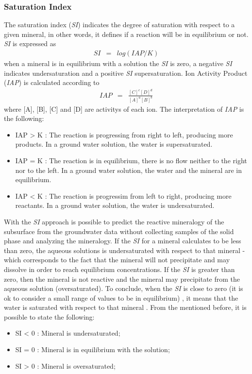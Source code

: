 \documentclass[ppgc,mestrado,english]{iiufrgs}
\begin{document}
\subsubsection{Saturation Index}
The saturation index (\emph{SI}) indicates the degree of saturation with respect to a given mineral, in other words, it defines if a reaction will be in equilibrium or not. \emph{SI} is expressed as
\begin{eqnarray} \label{eq:siEq}
SI &=& log (IAP / K )
\end{eqnarray}
when a mineral is in equilibrium with a solution the \emph{SI} is zero, a negative \emph{SI} indicates undersaturation and a positive \emph{SI} supersaturation. 
Ion Activity Product (\emph{IAP}) is calculated according to
\begin{eqnarray}
IAP &=& \frac{[C]^c [D]^d}{[A]^a[B]^b}
\end{eqnarray}
where [A], [B], [C] and [D] are activitys of each ion. The interpretation of \emph{IAP} is the following:
\begin{itemize}
\item IAP > K : The reaction is progressing from right to left, producing more products. In a ground water solution, the water is supersaturated.
\item IAP = K : The reaction is in equilibrium, there is no flow neither to the right nor to the left. In a ground water solution, the water and the mineral are in equilibrium.
\item IAP < K : The reaction is progressim from left to right, producing more reactants. In a ground water solution, the water is undersaturated.
\end{itemize}

With the \emph{SI} approach is possible to predict the reactive mineralogy of the subsurface from the groundwater data without collecting samples of the solid phase and analyzing the mineralogy. If the \emph{SI} for a mineral calculates to be less than zero, the aqueous solutions is undersaturated with respect to that mineral - which corresponds to the fact that the mineral will not precipitate and may dissolve in order to reach equilibrium concentrations. If the \emph{SI} is greater than zero, then the mineral is not reactive and the mineral may precipitate from the aqueous solution (oversaturated). To conclude, when the \emph{SI} is close to zero (it is ok to consider a small range of values to be in equilibrium) , it means that the water is saturated  with respect to that mineral \cite{Alley:93}. From the mentioned before, it is possible to state the following:
\begin{itemize}
\item SI < 0 : Mineral is undersaturated;
\item SI = 0 : Mineral is in equilibrium with the solution;
\item SI > 0 : Mineral is oversaturated;
\end{itemize}
\end{document}
